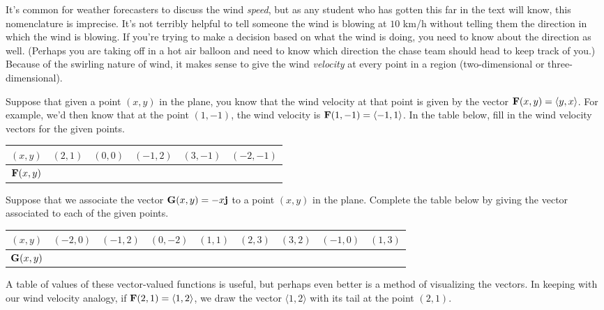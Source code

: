 \begin{pa} \label{PA:12.1}
It's common for weather forecasters to discuss the wind \emph{speed}, but as any student who has gotten this far in the text will know, this nomenclature is imprecise. It's not terribly helpful to tell someone the wind is blowing at $10$ km/h without telling them the direction in which the wind is blowing. If you're trying to make a decision based on what the wind is doing, you need to know about the direction as well. (Perhaps you are taking off in a hot air balloon and need to know which direction the chase team should head to keep track of you.) Because of the swirling nature of wind, it makes sense to give the wind \emph{velocity} at every point in a region (two-dimensional or three-dimensional). 

\ba
\item \label{enum:PA12.1F} Suppose that given a point $(x,y)$ in the plane, you know that the wind velocity at that point is given by the vector $\mathbf{F}(x,y) = \langle y,x\rangle$. For example, we'd then know that at the point $(1,-1)$, the wind velocity is $\mathbf{F}(1,-1) = \langle -1,1\rangle$. In the table below, fill in the wind velocity vectors for the given points.
  \begin{center}
    \begin{tabular}{c|c|c|c|c|c}
      $(x,y)$ & $(2,1)$ & $(0,0)$ & $(-1,2)$ & $(3,-1)$ & $(-2,-1)$\\\hline
$\mathbf{F}(x,y)$ & & & & &
    \end{tabular}
  \end{center}
\item \label{enum:PA12.1G} Suppose that we associate the vector $\mathbf{G}(x,y) = -x\mathbf{j}$ to a point $(x,y)$ in the plane. Complete the table below by giving the vector associated to each of the given points.
  \begin{center}
    \begin{tabular}{c|c|c|c|c|c|c|c|c}
      $(x,y)$ & $(-2,0)$ & $(-1,2)$ & $(0,-2)$ & $(1,1)$ & $(2,3)$ & $(3,2)$ & $(-1,0)$ & $(1,3)$\\\hline
$\mathbf{G}(x,y)$ & & & & & & &
    \end{tabular}
  \end{center}

\saveCount
\ea

A table of values of these vector-valued functions is useful, but perhaps even better is a method of visualizing the vectors. In keeping with our wind velocity analogy, if $\mathbf{F}(2,1) = \langle 1,2\rangle$, we draw the vector $\langle 1,2\rangle$ with its tail at the point $(2,1)$. 


\end{pa}
